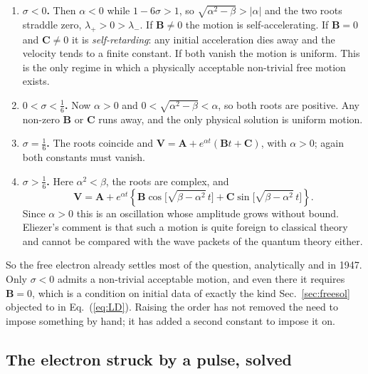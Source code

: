 \documentclass[preprint]{aastex701}
\begin{document}
\begin{enumerate}

\item \textbf{$\sigma<0$.} Then $\alpha<0$ while $1-6\sigma>1$, so
$\sqrt{\alpha^2-\beta}>|\alpha|$ and the two roots straddle zero,
$\lambda_+>0>\lambda_-$. If $\mathbf B\neq0$ the motion is self-accelerating.
If $\mathbf B=0$ and $\mathbf C\neq0$ it is \emph{self-retarding}: any initial
acceleration dies away and the velocity tends to a finite constant. If both
vanish the motion is uniform. This is the only regime in which a physically
acceptable non-trivial free motion exists.

\item \textbf{$0<\sigma<\tfrac16$.} Now $\alpha>0$ and
$0<\sqrt{\alpha^2-\beta}<\alpha$, so both roots are positive. Any non-zero
$\mathbf B$ or $\mathbf C$ runs away, and the only physical solution is uniform
motion.

\item \textbf{$\sigma=\tfrac16$.} The roots coincide and
$\mathbf V = \mathbf A + e^{\alpha t}(\mathbf Bt+\mathbf C)$, with $\alpha>0$;
again both constants must vanish.

\item \textbf{$\sigma>\tfrac16$.} Here $\alpha^2<\beta$, the roots are complex,
and
\begin{equation}
\mathbf V = \mathbf A + e^{\alpha t}\left\{
\mathbf B\cos\!\big[\sqrt{\beta-\alpha^2}\,t\big]
+ \mathbf C\sin\!\big[\sqrt{\beta-\alpha^2}\,t\big]\right\}.
\label{eq:oscillating}
\end{equation}
Since $\alpha>0$ this is an oscillation whose amplitude grows without bound.
Eliezer's comment is that such a motion is quite foreign to classical theory
and cannot be compared with the wave packets of the quantum theory either.

\end{enumerate}

So the free electron already settles most of the question, analytically and in
1947. Only $\sigma<0$ admits a non-trivial acceptable motion, and even there it
requires $\mathbf B=0$, which is a condition on initial data of exactly the kind
Sec.~\ref{sec:freesol} objected to in Eq.~(\ref{eq:LD}). Raising the order has
not removed the need to impose something by hand; it has added a second
constant to impose it on.

\subsection{The electron struck by a pulse, solved}
\label{sec:eliezerpulse}
\end{document}
